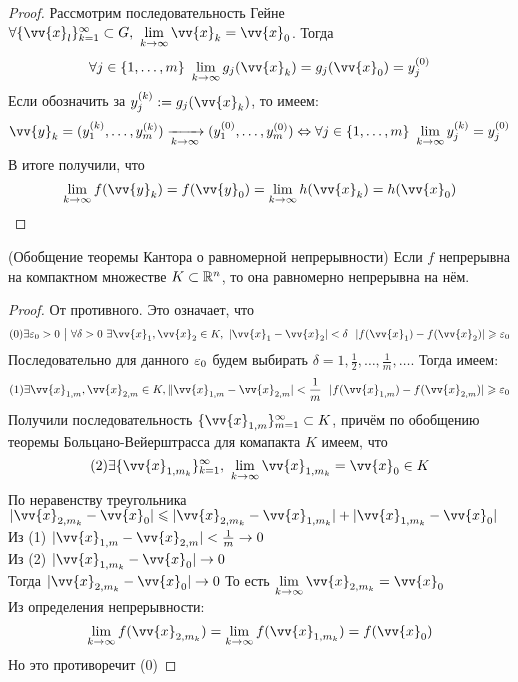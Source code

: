 \begin{proof}
	Рассмотрим последовательность Гейне $\forall \{\vv{x}_l\}_{k = 1}^\infty \subset G,\ \liml_{k \to \infty} \vv{x}_k = \vv{x}_0$. Тогда
	\[
		\forall j \in \range{m}\ \liml_{k \to \infty} g_j(\vv{x}_k) = g_j(\vv{x}_0) = y_j^{(0)}
	\]
	Если обозначить за $y_j^{(k)} := g_j(\vv{x}_k)$, то имеем:
	\[
		\vv{y}_k = (y_1^{(k)}, \ldots, y_m^{(k)}) \xrightarrow[k \to \infty]{} (y_1^{(0)}, \ldots, y_m^{(0)}) \lra \forall j \in \range{m}\ \liml_{k \to \infty} y_j^{(k)} = y_j^{(0)}
	\]
	В итоге получили, что
	\[
		\liml_{k \to \infty} f(\vv{y}_k) = f(\vv{y}_0) = \liml_{k \to \infty} h(\vv{x}_k) = h(\vv{x}_0)
	\]
\end{proof}

\begin{theorem} (Обобщение теоремы Кантора о равномерной непрерывности)
	Если $f$ непрерывна на компактном множестве $K \subset \mathbb{R}^n$, то она равномерно непрерывна на нём.
\end{theorem}

\begin{proof}
	От противного. Это означает, что
	\[(0)
		\exists \eps_0 > 0 \such \forall \delta > 0\ \exists \vv{x}_1, \vv{x}_2 \in K,\ |\vv{x}_1 - \vv{x}_2| < \delta\ \ |f(\vv{x}_1) - f(\vv{x}_2)| \ge \eps_0
	\]
	Последовательно для данного $\varepsilon_0$ будем выбирать $\delta = 1, \frac{1}{2}, \ldots, \frac{1}{m}, \ldots$. Тогда имеем:
	\[(1)
		\exists \vv{x}_{1, m}, \vv{x}_{2, m} \in K, \|\vv{x}_{1, m} - \vv{x}_{2, m}| < \frac{1}{m}\ \ |f(\vv{x}_{1, m}) - f(\vv{x}_{2, m})| \ge \eps_0
	\]
	Получили последовательность $\{\vv{x}_{1, m}\}_{m = 1}^\infty \subset K$, причём по обобщению теоремы Больцано-Вейерштрасса для комапакта $K$ имеем, что
	\[(2)
		\exists \{\vv{x}_{1, m_k}\}_{k = 1}^\infty,\ \liml_{k \to \infty} \vv{x}_{1, m_k} = \vv{x}_0 \in K
	\]
	По неравенству треугольника
	 $|\vv{x}_{2, m_k} - \vv{x}_0| \leq |\vv{x}_{2, m_k} - \vv{x}_{1, m_k}| + |\vv{x}_{1, m_k} - \vv{x}_0|$ \\
	Из (1) $|\vv{x}_{1, m} - \vv{x}_{2, m}| < \frac{1}{m} \to 0$ \\
	Из (2) $|\vv{x}_{1, m_k} - \vv{x}_0| \to 0$ \\
	Тогда  $|\vv{x}_{2, m_k} - \vv{x}_0| \to 0$  То есть $\liml_{k \to \infty} \vv{x}_{2, m_k} = \vv{x}_0$ \\
	Из определения непрерывности:
	\[
		\liml_{k \to \infty} f(\vv{x}_{2, m_k}) = \liml_{k \to \infty} f(\vv{x}_{1, m_k}) = f(\vv{x}_0)
	\]
	Но это противоречит (0)
\end{proof}

